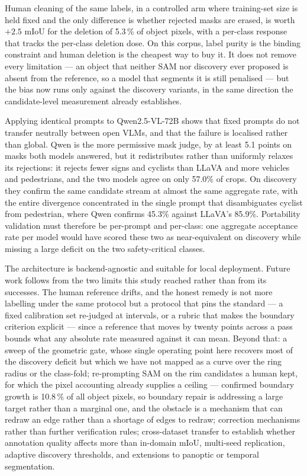 \documentclass[conference]{IEEEtran}
\begin{document}
Human cleaning of the same labels, in a controlled arm where training-set size is held fixed and the only difference is whether rejected masks are erased, is worth $+2.5$ mIoU for the deletion of 5.3\,\% of object pixels, with a per-class response that tracks the per-class deletion dose. On this corpus, label purity is the binding constraint and human deletion is the cheapest way to buy it.
It does not remove every limitation --- an object that neither SAM nor discovery ever proposed is absent from the reference, so a model that segments it is still penalised --- but the bias now runs only against the discovery variants, in the same direction the candidate-level measurement already establishes.

Applying identical prompts to Qwen2.5-VL-72B shows that fixed prompts do not transfer neutrally between open VLMs, and that the failure is localised rather than global. Qwen is the more permissive mask judge, by at least 5.1 points on masks both models answered, but it redistributes rather than uniformly relaxes its rejections: it rejects fewer signs and cyclists than LLaVA and more vehicles and pedestrians, and the two models agree on only 57.0\% of crops. On discovery they confirm the same candidate stream at almost the same aggregate rate, with the entire divergence concentrated in the single prompt that disambiguates cyclist from pedestrian, where Qwen confirms 45.3\% against LLaVA's 85.9\%. Portability validation must therefore be per-prompt and per-class: one aggregate acceptance rate per model would have scored these two as near-equivalent on discovery while missing a large deficit on the two safety-critical classes.

The architecture is backend-agnostic and suitable for local deployment.
Future work follows from the two limits this study reached rather than from its successes.
The human reference drifts, and the honest remedy is not more labelling under the same protocol but a
protocol that pins the standard --- a fixed calibration set re-judged at intervals, or a rubric that
makes the boundary criterion explicit --- since a reference that moves by twenty points across a pass
bounds what any absolute rate measured against it can mean.
Beyond that: a sweep of the geometric gate, whose single operating point here recovers most of the
discovery deficit but which we have not mapped as a curve over the ring radius or the class-fold;
re-prompting SAM on the rim candidates
a human kept, for which the pixel accounting already supplies a ceiling --- confirmed boundary growth is
10.8\,\% of all object pixels, so boundary repair is addressing a large target rather than a marginal
one, and the obstacle is a mechanism that can redraw an edge rather than a shortage of edges to redraw;
correction mechanisms rather than further verification rules; cross-dataset transfer to
establish whether annotation quality affects more than in-domain mIoU, multi-seed replication,
adaptive discovery thresholds, and extensions to panoptic or temporal segmentation.
\end{document}
